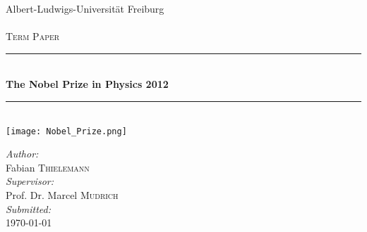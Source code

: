 \begin{titlepage}
\begin{center}

{\large \uppercase Albert-Ludwigs-Universität Freiburg}\\
[1cm]
\textsc{\LARGE }\\
[1.cm]

\textsc{\Large Term Paper}\\
[0.5cm]

\hrule ~\\ [0.4cm]
{ \huge \bfseries The Nobel Prize in Physics 2012 \\[0.6cm]}
\hrule ~\\ [2cm]
\texttt{[image: Nobel\_Prize.png]}
\end{center}
\vfill
\textit{Author:}\\
Fabian \textsc{Thielemann}\\
[0.5cm]
\textit{Supervisor:}\\
Prof. Dr. Marcel \textsc{Mudrich}\\
[0.5cm]
\textit{Submitted:}\\
\today


\end{titlepage}
